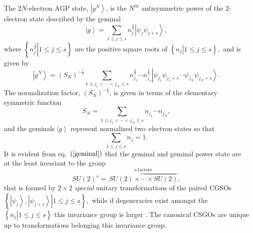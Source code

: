 \documentclass[aps,preprint]{revtex4}%
\begin{document}
The $2N$-electron AGP state, $\left\vert g^{N}\right\rangle $, is the $N^{th}$
antisymmetric power of the $2$-electron state described by the geminal
\begin{equation}
\left\vert g\right\rangle =\sum_{1\leq j\leq s}n_{j}^{\frac{1}{2}}\left\vert
\psi_{j}\psi_{j+s}\right\rangle , \label{geminal}%
\end{equation}
where $\left\{  \left.  n_{j}^{\frac{1}{2}}\right\vert 1\leq j\leq s\right\}
$ are the positive square roots of $\left\{  \left.  n_{j}\right\vert 1\leq
j\leq s\right\}  ,$ and is given by \cite{Weiner&ortiz04}
\begin{equation}
\left\vert g^{N}\right\rangle =\left(  S_{N}\right)  ^{-\frac{1}{2}}%
\sum_{1\leq j_{1}<\cdots<j_{N}\leq s}n_{j_{1}}^{\frac{1}{2}}\cdots n_{j_{s}%
}^{\frac{1}{2}}\left\vert \psi_{j_{1}}\psi_{j_{1}+s}\cdots\psi_{j_{N}}%
\psi_{j_{N}+s}\right\rangle . \label{agp}%
\end{equation}
The normalization factor, $\left(  S_{N}\right)  ^{-\frac{1}{2}}$, is given in
terms of the elementary symmetric function
\begin{equation}
S_{N}=\sum_{1\leq j_{1}<\cdots<j_{N}\leq s}n_{j_{1}}\cdots n_{j_{N}},
\end{equation}
and the geminals $\left\vert g\right\rangle $ represent normalized
two--electron states so that
\begin{equation}
\sum_{1\leq j\leq s}n_{j}=1.
\end{equation}
It is evident from eq.\ $\left(  \ref{geminal}\right)  $ that the geminal and
geminal power state are at the least invariant to the group
\begin{equation}
SU\left(  2\right)  ^{s}=\overset{s\text{-factors}}{\overbrace{\,SU\left(
2\right)  \times\cdots\times SU\left(  2\right)  }},
\end{equation}
that is formed by $2\times2$ \emph{special} unitary transformations of the
paired CGSOs $\left\{  \left.  \left\vert \psi_{j}\right\rangle ,\left\vert
\psi_{j+s}\right\rangle \right\vert 1\leq j\leq s\right\}  ,$ while if
degeneracies exist amongst the $\left\{  \left.  n_{j}\right\vert 1\leq j\leq
s\right\}  $ this invariance group is larger \cite{AGPCoherent}. The canonical
CSGOs are unique up to transformations belonging this invariance group.
\end{document}
